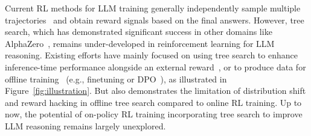 {%





Current RL methods for LLM training generally independently sample multiple trajectories~\cite{shao2024deepseekmath,wang2024mathshepherd,touvron2023llama2} and obtain reward signals based on the final answers. 
However, tree search, which has demonstrated significant success in other domains like AlphaZero~\cite{silver2017mastering}, remains under-developed in reinforcement learning for LLM reasoning. 
Existing efforts have mainly focused on using tree search to enhance inference-time performance alongside an external reward~\cite{zhang2024rest, chen2024alphamath}, or to produce data for offline training~\cite{chen2024alphamath,xie2024monte,zhang2024rest} (e.g., finetuning or DPO~\cite{rafailov2023direct}), as illustrated in Figure~\ref{fig:illustration}. But \citet{guo2025deepseek} also demonstrates the limitation of distribution shift and reward hacking in offline tree search compared to online RL training. Up to now, the potential of on-policy RL training incorporating tree search to improve LLM reasoning remains largely unexplored.



}
